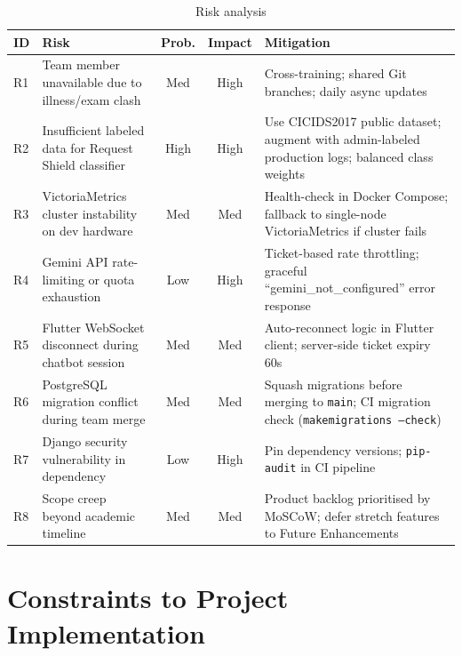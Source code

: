 \begin{table}[H]
\centering
\caption{Risk analysis}\label{tab:risk}
\begin{tabularx}{\textwidth}{@{}l X c c X@{}}
\toprule
\textbf{ID} & \textbf{Risk} & \textbf{Prob.} & \textbf{Impact} & \textbf{Mitigation}\\
\midrule
R1 & Team member unavailable due to illness/exam clash &
  Med & High & Cross-training; shared Git branches; daily async updates\\
R2 & Insufficient labeled data for Request Shield classifier &
  High & High & Use CICIDS2017 public dataset; augment with admin-labeled
  production logs; balanced class weights\\
R3 & VictoriaMetrics cluster instability on dev hardware &
  Med & Med & Health-check in Docker Compose; fallback to single-node
  VictoriaMetrics if cluster fails\\
R4 & Gemini API rate-limiting or quota exhaustion &
  Low & High & Ticket-based rate throttling;
  graceful ``gemini\_not\_configured'' error response\\
R5 & Flutter WebSocket disconnect during chatbot session &
  Med & Med & Auto-reconnect logic in Flutter client; server-side
  ticket expiry 60s\\
R6 & PostgreSQL migration conflict during team merge &
  Med & Med & Squash migrations before merging to \texttt{main};
  CI migration check (\texttt{makemigrations --check})\\
R7 & Django security vulnerability in dependency &
  Low & High & Pin dependency versions;
  \texttt{pip-audit} in CI pipeline\\
R8 & Scope creep beyond academic timeline &
  Med & Med & Product backlog prioritised by MoSCoW; defer stretch
  features to Future Enhancements\\
\bottomrule
\end{tabularx}
\end{table}

\section{Constraints to Project Implementation}

